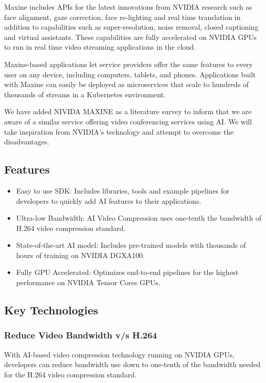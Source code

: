 Maxine includes APIs for the latest innovations from NVIDIA research such as face alignment, 
gaze correction, face re-lighting and real time translation in addition to capabilities such 
as super-resolution, noise removal, closed captioning and virtual assistants. These capabilities are 
fully accelerated on NVIDIA GPUs to run in real time video streaming applications in the cloud.

Maxine-based applications let service providers offer the same features to every user on any device,
including computers, tablets, and phones. Applications built with Maxine can easily be deployed as 
microservices that scale to hundreds of thousands of streams in a Kubernetes environment.

We have added NIVIDA MAXINE as a literature survey to inform that we are aware of a similar service offering 
video conferencing services using AI. We will take inspiration from NVIDIA's technology and attempt to overcome
the disadvantages.

\subsection{Features}

\begin{itemize}
    \item Easy to use SDK: Includes libraries, tools and example pipelines 
    for developers to quickly add AI features to their applications.
    \item Ultra-low Bandwidth: AI Video Compression uses one-tenth the 
    bandwidth of H.264 video compression standard.
    \item State-of-the-art AI model: Includes pre-trained models with thousands of hours 
    of training on NVIDIA DGX\texttrademark A100.
    \item Fully GPU Accelerated: Optimizes end-to-end pipelines for the highest performance 
    on NVIDIA Tensor Cores GPUs.
\end{itemize}

\subsection{Key Technologies}

\subsubsection{Reduce Video Bandwidth v/s  H.264}
With AI-based video compression technology running on NVIDIA GPUs, 
developers can reduce bandwidth use down to one-tenth of the bandwidth needed 
for the H.264 video compression standard.

